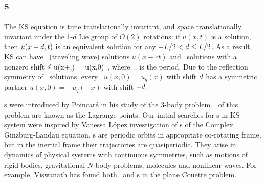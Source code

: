 \subsection{\Rpo s}

The KS equation  is time translationally invariant,
and space translationally invariant
under the 1-$d$ Lie group of $O(2)$ rotations: if
$u(x,t)$ is a solution, then $u(x+d,t)$ is an equivalent
solution for any $-L/2 < d \leq L/2$.
As a result, KS can have \reqva\ (traveling wave) solutions
$u(x-ct)$ and \rpo\ solutions with a nonzero shift $d$
\beq
u(x+\shift,\period{}) = u(x,0)
\,,
where $\period{}$ is the period.
Due to the reflection symmetry of \KS\ solutions, every \rpo\ 
$u(x,0) = u_q(x)$ with shift $d$ has a symmetric partner 
$u(x,0) = -u_q(-x)$ with shift $-d$.

{\Rpo s} were introduced by Poincar\'e in his study of
the 3-body problem.
\Reqva\ of this problem are known as the Lagrange points. 
Our initial searches for \rpo s in KS system were
inspired by Vanessa L{\'o}pez investigation
of {\rpo s} of the Complex Ginzburg-Landau equation.
{\Rpo s} are periodic orbits in appropriate co-rotating frame,
but in the inertial frame their trajectories
are quasiperiodic.
They arise in dynamics of physical systems
with continuous symmetries, such as motions of rigid bodies, gravitational
$N$-body problems, molecules and nonlinear waves.
For example, Viswanath %
has found both \reqva\ and \rpo s in the plane Couette problem.


